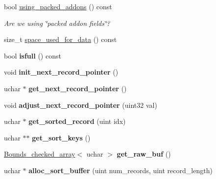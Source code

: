 \begin{DoxyCompactItemize}
bool \mbox{\hyperlink{classFilesort__info_a4c21080320673a7577be06d71e37d24f}{using\+\_\+packed\+\_\+addons}} () const
\begin{DoxyCompactList}\small\item\em Are we using \char`\"{}packed addon fields\char`\"{}? \end{DoxyCompactList}\item 
size\+\_\+t \mbox{\hyperlink{classFilesort__info_a67f9f112962f35197841045fd24d9f85}{space\+\_\+used\+\_\+for\+\_\+data}} () const
\item 
\mbox{\label{classFilesort__info_a030382b513d47af9179870f67540d9b6}} 
bool {\bfseries isfull} () const
\item 
\mbox{\label{classFilesort__info_a1a409fbbef889fa68f9e1e6a4912523a}} 
void {\bfseries init\+\_\+next\+\_\+record\+\_\+pointer} ()
\item 
\mbox{\label{classFilesort__info_aa75dc07c503166a32acadb0a802fb76a}} 
uchar $\ast$ {\bfseries get\+\_\+next\+\_\+record\+\_\+pointer} ()
\item 
\mbox{\label{classFilesort__info_a4644f9bd2a6ba4ff045bb2af0c757ad1}} 
void {\bfseries adjust\+\_\+next\+\_\+record\+\_\+pointer} (uint32 val)
\item 
\mbox{\label{classFilesort__info_af0a69739dbcea1c2763cc34b8d485c15}} 
uchar $\ast$ {\bfseries get\+\_\+sorted\+\_\+record} (uint idx)
\item 
\mbox{\label{classFilesort__info_a25711bb2856bdc3eca31b7122336e15d}} 
uchar $\ast$$\ast$ {\bfseries get\+\_\+sort\+\_\+keys} ()
\item 
\mbox{\label{classFilesort__info_a2310ee0e9ed4badb1d712d66a835458f}} 
\mbox{\hyperlink{classBounds__checked__array}{Bounds\+\_\+checked\+\_\+array}}$<$ uchar $>$ {\bfseries get\+\_\+raw\+\_\+buf} ()
\item 
\mbox{\label{classFilesort__info_a8f6ac5102866bd89dee2856e71a5e28e}} 
uchar $\ast$ {\bfseries alloc\+\_\+sort\+\_\+buffer} (uint num\+\_\+records, uint record\+\_\+length)
\item 
$$
\end{DoxyCompactItemize}
